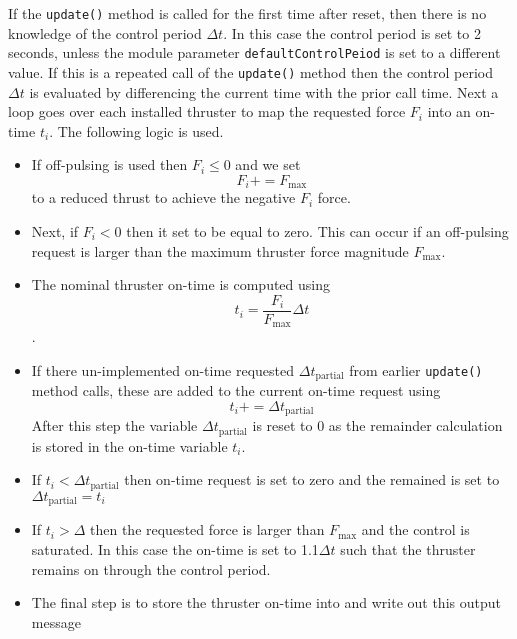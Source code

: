 If the {\tt update()} method is called for the first time after reset, then there is no knowledge of the control period $\Delta t$.  In this case the control period is set to 2 seconds, unless the module parameter \texttt{defaultControlPeiod} is set to a different value. If this is a repeated call of the {\tt update()} method then the control period $\Delta t$ is evaluated by differencing the current time with the prior call time.  Next a loop goes over each installed thruster to map the requested force $F_{i}$ into an on-time $t_{i}$.  The following logic is used.  
\begin{itemize}
	\item If off-pulsing is used then $F_{i}\le 0$ and we set $$F_{i} += F_{\text{max}}$$ to a reduced thrust to achieve the negative $F_{i}$ force.  
	\item Next, if $F_{i} < 0$ then it set to be equal to zero.  This can occur if an off-pulsing request is larger than the maximum thruster force magnitude $F_{\text{max}}$.  
	\item The nominal thruster on-time is computed using $$t_{i}  = \dfrac{F_{i}}{F_{\text{max}}} \Delta t$$. 
	\item If there un-implemented on-time requested $\Delta t_{\text{partial}}$ from earlier  {\tt update()} method calls, these are added to the current on-time request using $$t_{i} += \Delta t_{\text{partial}}$$ After this step the variable $\Delta t_{\text{partial}}$ is reset to 0 as the remainder calculation is stored in the on-time variable $t_{i}$.
	\item If $t_{i} < \Delta t_{\text{partial}}$ then on-time request is set to zero and the remained is set to $\Delta t_{\text{partial}} = t_{i}$
	\item If $t_{i} > \Delta $ then the requested force is larger than $F_{\text{max}}$ and the control is saturated.  In this case the on-time is set to 1.1$\Delta t$ such that the thruster remains on through the control period.
	\item The final step is to store the thruster on-time into  and write out this output message
\end{itemize}
